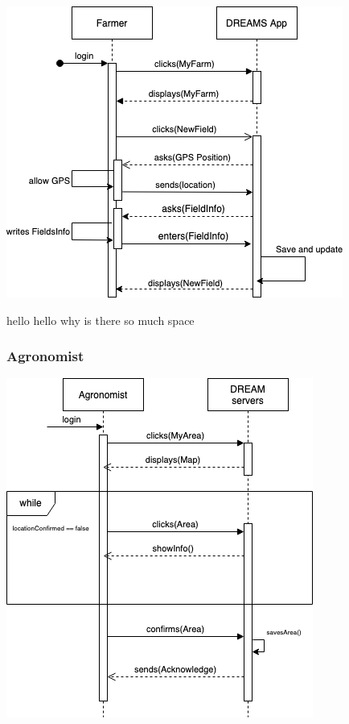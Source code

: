 \begin{center}
\includegraphics[scale=0.6]{Files/sequence_disgrams/thePNGs/farmer_newField.png}\\
\end{center}
hello hello why is there so much space 

\subsubsection{Agronomist}

\begin{center}
\includegraphics[scale=0.6]{Files/sequence_disgrams/thePNGs/agronomist_choosingLocation.png}\\
\end{center}


